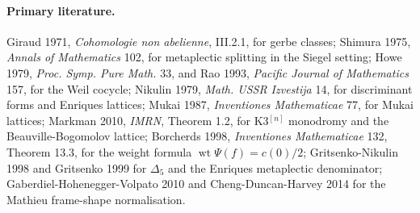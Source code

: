 \paragraph{Primary literature.}
Giraud 1971, \emph{Cohomologie non abelienne}, III.2.1, for gerbe
classes; Shimura 1975, \emph{Annals of Mathematics} 102, for
metaplectic splitting in the Siegel setting; Howe 1979, \emph{Proc.
Symp. Pure Math.} 33, and Rao 1993, \emph{Pacific Journal of
Mathematics} 157, for the Weil cocycle; Nikulin 1979, \emph{Math.
USSR Izvestija} 14, for discriminant forms and Enriques lattices;
Mukai 1987, \emph{Inventiones Mathematicae} 77, for Mukai lattices;
Markman 2010, \emph{IMRN}, Theorem 1.2, for K3$^{[n]}$ monodromy and
the Beauville-Bogomolov lattice; Borcherds 1998, \emph{Inventiones
Mathematicae} 132, Theorem 13.3, for the weight formula
$\operatorname{wt}\Psi(f)=c(0)/2$; Gritsenko-Nikulin 1998 and
Gritsenko 1999 for $\Delta_5$ and the Enriques metaplectic
denominator; Gaberdiel-Hohenegger-Volpato 2010 and
Cheng-Duncan-Harvey 2014 for the Mathieu frame-shape normalisation.
